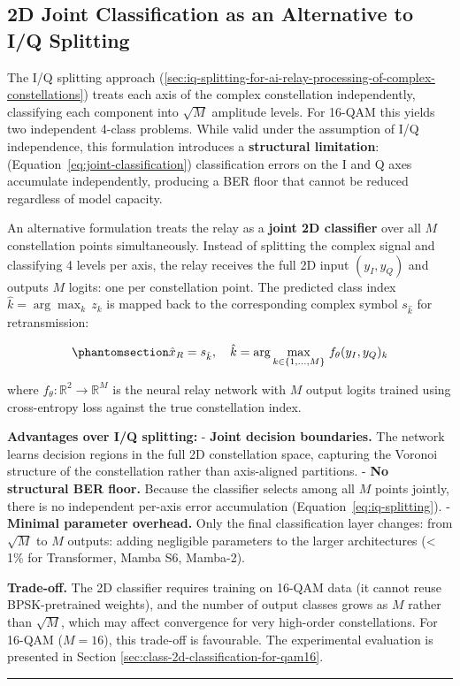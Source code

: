 \subsection{2D Joint Classification as an Alternative to I/Q Splitting}\label{sec:d-joint-classification-as-an-alternative-to-iq-splitting}

The I/Q splitting approach (\ref{sec:iq-splitting-for-ai-relay-processing-of-complex-constellations}) treats each axis of the complex constellation independently, classifying each component into \(\sqrt{M}\) amplitude levels. For 16-QAM this yields two independent 4-class problems. While valid under the assumption of I/Q independence, this formulation introduces a \textbf{structural limitation}: (Equation~\ref{eq:joint-classification}) classification errors on the I and Q axes accumulate independently, producing a BER floor that cannot be reduced regardless of model capacity.

An alternative formulation treats the relay as a \textbf{joint 2D classifier} over all \(M\) constellation points simultaneously. Instead of splitting the complex signal and classifying 4 levels per axis, the relay receives the full 2D input \((y_I, y_Q)\) and outputs \(M\) logits: one per constellation point. The predicted class index \(\hat{k} = \arg\max_k \, z_k\) is mapped back to the corresponding complex symbol \(s_{\hat{k}}\) for retransmission:

\begin{equation}\protect\phantomsection\label{eq:joint-classification}{\hat{x}_R = s_{\hat{k}}, \quad \hat{k} = \arg\max_{k \in \{1, \dots, M\}} \, f_\theta(y_I, y_Q)_k
}\end{equation}

where \(f_\theta: \mathbb{R}^2 \to \mathbb{R}^M\) is the neural relay network with \(M\) output logits trained using cross-entropy loss against the true constellation index.

\textbf{Advantages over I/Q splitting:} - \textbf{Joint decision boundaries.} The network learns decision regions in the full 2D constellation space, capturing the Voronoi structure of the constellation rather than axis-aligned partitions. - \textbf{No structural BER floor.} Because the classifier selects among all \(M\) points jointly, there is no independent per-axis error accumulation (Equation~\ref{eq:iq-splitting}). - \textbf{Minimal parameter overhead.} Only the final classification layer changes: from \(\sqrt{M}\) to \(M\) outputs: adding negligible parameters to the larger architectures (\textless{} 1\% for Transformer, Mamba S6, Mamba-2).

\textbf{Trade-off.} The 2D classifier requires training on 16-QAM data (it cannot reuse BPSK-pretrained weights), and the number of output classes grows as \(M\) rather than \(\sqrt{M}\), which may affect convergence for very high-order constellations. For 16-QAM (\(M = 16\)), this trade-off is favourable. The experimental evaluation is presented in Section \ref{sec:class-2d-classification-for-qam16}.

\begin{center}\rule{0.5\linewidth}{0.5pt}\end{center}